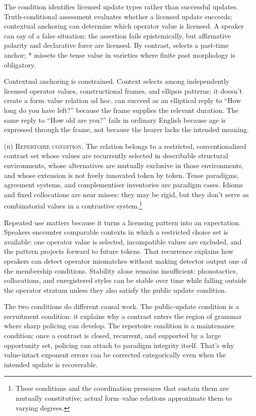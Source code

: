 \documentclass[12pt,letterpaper]{article}
\begin{document}
The condition identifies licensed update types rather than successful updates. Truth-conditional assessment evaluates whether a licensed update succeeds; contextual anchoring can determine which operator value is licensed. A speaker can say  of a false situation: the assertion fails epistemically, but affirmative polarity and declarative force are licensed. By contrast,  selects a past-time anchor; * missets the tense value in varieties where finite past morphology is obligatory.

Contextual anchoring is constrained. Context selects among independently licensed operator values, constructional frames, and ellipsis patterns; it doesn't create a form--value relation ad hoc.  can succeed as an elliptical reply to \enquote{How long do you have left?} because the frame supplies the relevant duration. The same reply to \enquote{How old are you?} fails in ordinary English because age is expressed through the  frame, not because the hearer lacks the intended meaning.

\textsc{(ii) Repertoire condition.} The relation belongs to a restricted, conventionalized contrast set whose values are recurrently selected in describable structural environments, whose alternatives are mutually exclusive in those environments, and whose extension is not freely innovated token by token. Tense paradigms, agreement systems, and complementiser inventories are paradigm cases. Idioms and fixed collocations are near misses: they may be rigid, but they don't serve as combinatorial values in a contrastive system.\footnote{These conditions and the coordination pressures that sustain them are mutually constitutive; actual form--value relations approximate them to varying degrees.}

Repeated use matters because it turns a licensing pattern into an expectation. Speakers encounter comparable contexts in which a restricted choice set is available: one operator value is selected, incompatible values are excluded, and the pattern projects forward to future tokens. That recurrence explains how speakers can detect operator mismatches without making detector output one of the membership conditions. Stability alone remains insufficient: phonotactics, collocations, and enregistered styles can be stable over time while falling outside the operator stratum unless they also satisfy the public update condition.

The two conditions do different causal work. The public-update condition is a recruitment condition: it explains why a contrast enters the region of grammar where sharp policing can develop. The repertoire condition is a maintenance condition: once a contrast is closed, recurrent, and supported by a large opportunity set, policing can attach to paradigm integrity itself. That's why value-intact exponent errors can be corrected categorically even when the intended update is recoverable.
\end{document}
